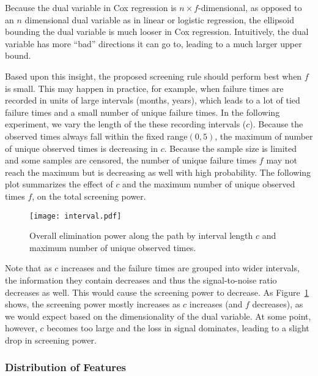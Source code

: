 Because the dual variable in Cox regression is $n\times f$-dimensional, as opposed to an $n$ dimensional dual variable as in linear or logistic regression, the ellipsoid bounding the dual variable is much looser in Cox regression. Intuitively, the dual variable has more ``bad'' directions it can go to, leading to a much larger upper bound.

Based upon this insight, the proposed screening rule should perform best when $f$ is small. This may happen in practice, for example, when failure times are recorded in units of large intervals (months, years), which leads to a lot of tied failure times and a small number of unique failure times. In the following experiment, we vary the length of the these recording intervals ($c$). Because the observed times always fall within the fixed range$(0,5)$, the maximum of number of unique observed times is decreasing in $c$. Because the sample size is limited and some samples are censored, the number of unique failure times $f$ may not reach the maximum but is decreasing as well with high probability. The following plot summarizes the effect of $c$ and the maximum number of unique observed times $f$, on the total screening power.

\begin{figure}[ht]
    \centering
    \texttt{[image: interval.pdf]}
    \caption[Overall power by interval length $c$ and maximum number of unique observed times
    ]{Overall elimination power along the path by interval length $c$ and maximum number of unique observed times.\label{Fig:interval}}
\end{figure}

Note that as $c$ increases and the failure times are grouped into wider intervals, the information they contain decreases and thus the signal-to-noise ratio decreases as well. This would cause the screening power to decrease. As Figure~\ref{Fig:interval} shows, the screening power mostly increases as $c$ increases (and $f$ decreases), as we would expect based on the dimensionality of the dual variable. At some point, however, $c$ becomes too large and the loss in signal dominates, leading to a slight drop in screening power.

\subsubsection{Distribution of Features}

